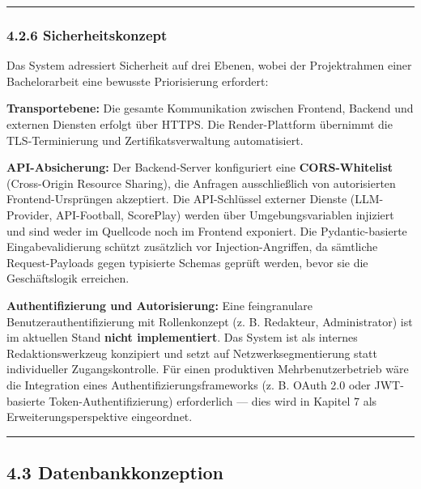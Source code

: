 \begin{center}\rule{0.5\linewidth}{0.5pt}\end{center}

\subsubsection{4.2.6 Sicherheitskonzept}\label{sicherheitskonzept}

Das System adressiert Sicherheit auf drei Ebenen, wobei der
Projektrahmen einer Bachelorarbeit eine bewusste Priorisierung
erfordert:

\textbf{Transportebene:} Die gesamte Kommunikation zwischen Frontend,
Backend und externen Diensten erfolgt über HTTPS. Die Render-Plattform
übernimmt die TLS-Terminierung und Zertifikatsverwaltung automatisiert.

\textbf{API-Absicherung:} Der Backend-Server konfiguriert eine
\textbf{CORS-Whitelist} (Cross-Origin Resource Sharing), die Anfragen
ausschließlich von autorisierten Frontend-Ursprüngen akzeptiert. Die
API-Schlüssel externer Dienste (LLM-Provider, API-Football, ScorePlay)
werden über Umgebungsvariablen injiziert und sind weder im Quellcode
noch im Frontend exponiert. Die Pydantic-basierte Eingabevalidierung
schützt zusätzlich vor Injection-Angriffen, da sämtliche
Request-Payloads gegen typisierte Schemas geprüft werden, bevor sie die
Geschäftslogik erreichen.

\textbf{Authentifizierung und Autorisierung:} Eine feingranulare
Benutzerauthentifizierung mit Rollenkonzept (z. B. Redakteur,
Administrator) ist im aktuellen Stand \textbf{nicht implementiert}. Das
System ist als internes Redaktionswerkzeug konzipiert und setzt auf
Netzwerksegmentierung statt individueller Zugangskontrolle. Für einen
produktiven Mehrbenutzerbetrieb wäre die Integration eines
Authentifizierungsframeworks (z. B. OAuth 2.0 oder JWT-basierte
Token-Authentifizierung) erforderlich --- dies wird in Kapitel 7 als
Erweiterungsperspektive eingeordnet.

\begin{center}\rule{0.5\linewidth}{0.5pt}\end{center}

\subsection{4.3 Datenbankkonzeption}\label{datenbankkonzeption}

